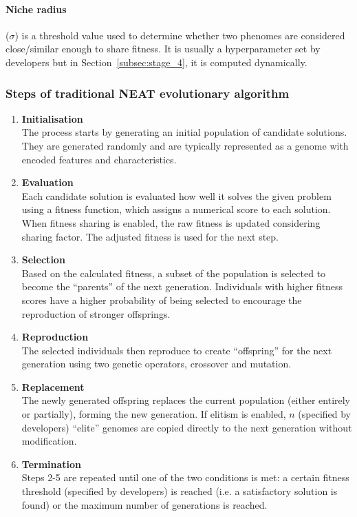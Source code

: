 \paragraph{Niche radius} ($\sigma$) is a threshold value used to determine whether two phenomes are considered close/similar enough to share fitness. It is usually a hyperparameter set by developers but in Section~\ref{subsec:stage_4}, it is computed dynamically. 


\subsubsection{Steps of traditional NEAT evolutionary algorithm}
\begin{enumerate}
    \item \textbf{Initialisation} \\
    The process starts by generating an initial population of candidate solutions. They are generated randomly and are typically represented as a genome with encoded features and characteristics. 

    \item \textbf{Evaluation} \\
    Each candidate solution is evaluated how well it solves the given problem using a fitness function, which assigns a numerical score to each solution. When fitness sharing is enabled, the raw fitness is updated considering sharing factor. The adjusted fitness is used for the next step. 

    \item \textbf{Selection} \\
    Based on the calculated fitness, a subset of the population is selected to become the ``parents'' of the next generation. Individuals with higher fitness scores have a higher probability of being selected to encourage the reproduction of stronger offsprings. 

    \item \textbf{Reproduction} \\
    The selected individuals then reproduce to create ``offspring'' for the next generation using two genetic operators, crossover and mutation. 

    \item \textbf{Replacement} \\
    The newly generated offspring replaces the current population (either entirely or partially), forming the new generation. If elitism is enabled, $n$ (specified by developers) ``elite'' genomes are copied directly to the next generation without modification. 

    \item \textbf{Termination} \\
    Steps 2-5 are repeated until one of the two conditions is met: a certain fitness threshold (specified by developers) is reached (i.e. a satisfactory solution is found) or the maximum number of generations is reached. 
\end{enumerate}


